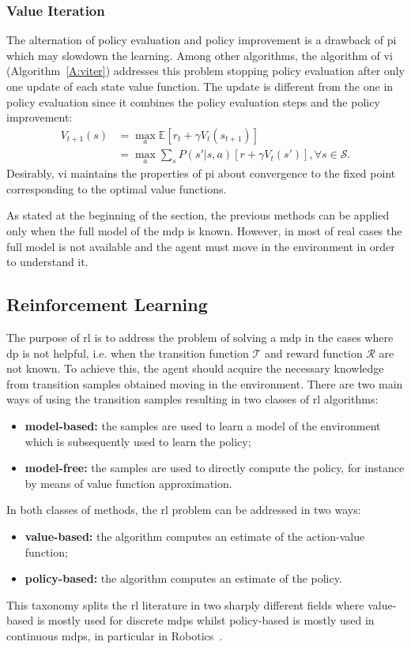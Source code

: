 \subsubsection{Value Iteration}
The alternation of policy evaluation and policy improvement is a drawback of \gls{pi} which may slowdown the learning. Among other algorithms, the algorithm of \gls{vi} (Algorithm~\ref{A:viter}) addresses this problem stopping policy evaluation after only one update of each state value function. The update is different from the one in policy evaluation since it combines the policy evaluation steps and the policy improvement:
\begin{align}
 V_{t+1} (s) &= \max_a \mathbb{E}[r_t + \gamma V_t(s_{t+1})]\nonumber\\
             &= \max_a \sum_s P(s' | s, a)[r + \gamma V_t(s')], \forall s \in \mathcal{S}. 
\end{align}
Desirably, \gls{vi} maintains the properties of \gls{pi} about convergence to the fixed point corresponding to the optimal value functions.

As stated at the beginning of the section, the previous methods can be applied only when the full model of the \gls{mdp} is known. However, in most of real cases the full model is not available and the agent must move in the environment in order to understand it.

\subsection{Reinforcement Learning}
The purpose of \gls{rl} is to address the problem of solving a \gls{mdp} in the cases where \gls{dp} is not helpful, i.e. when the transition function $\mathcal{T}$ and reward function $\mathcal{R}$ are not known. To achieve this, the agent should acquire the necessary knowledge from transition samples obtained moving in the environment. There are two main ways of using the transition samples resulting in two classes of \gls{rl} algorithms:
\begin{itemize}
 \item \textbf{model-based:} the samples are used to learn a model of the environment which is subsequently used to learn the policy;
 \item \textbf{model-free:} the samples are used to directly compute the policy, for instance by means of value function approximation.
\end{itemize}
In both classes of methods, the \gls{rl} problem can be addressed in two ways:
\begin{itemize}
 \item \textbf{value-based:} the algorithm computes an estimate of the action-value function;
 \item \textbf{policy-based:} the algorithm computes an estimate of the policy.
\end{itemize}
This taxonomy splits the \gls{rl} literature in two sharply different fields where value-based is mostly used for discrete \glspl{mdp} whilst policy-based is mostly used in continuous \glspl{mdp}, in particular in Robotics~\cite{kober2013reinforcement}.

